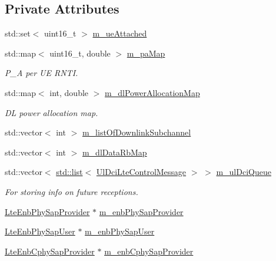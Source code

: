 \subsection*{Private Attributes}
\begin{DoxyCompactItemize}
\item 
std\+::set$<$ uint16\+\_\+t $>$ \hyperlink{classns3_1_1LteEnbPhy_a226e8d8e856ac3b90d45db11bbe23400}{m\+\_\+ue\+Attached}
\item 
std\+::map$<$ uint16\+\_\+t, double $>$ \hyperlink{classns3_1_1LteEnbPhy_a9fa0dd1722f59badf99d2aa32a417fff}{m\+\_\+pa\+Map}
\begin{DoxyCompactList}\small\item\em P\+\_\+A per UE R\+N\+TI. \end{DoxyCompactList}\item 
std\+::map$<$ int, double $>$ \hyperlink{classns3_1_1LteEnbPhy_a9296f50cf6ecc1ced51fb5172e49834f}{m\+\_\+dl\+Power\+Allocation\+Map}
\begin{DoxyCompactList}\small\item\em DL power allocation map. \end{DoxyCompactList}\item 
std\+::vector$<$ int $>$ \hyperlink{classns3_1_1LteEnbPhy_a9409ac53b340b281a15b614edd3ea5d1}{m\+\_\+list\+Of\+Downlink\+Subchannel}
\item 
std\+::vector$<$ int $>$ \hyperlink{classns3_1_1LteEnbPhy_a3fb8cd42886925222a259b135fa0c5e4}{m\+\_\+dl\+Data\+Rb\+Map}
\item 
std\+::vector$<$ \hyperlink{openflow-interface_8h_afd9bcfa176617760671b67580f536fa7}{std\+::list}$<$ \hyperlink{classns3_1_1UlDciLteControlMessage}{Ul\+Dci\+Lte\+Control\+Message} $>$ $>$ \hyperlink{classns3_1_1LteEnbPhy_a6c2e4f7f8dd477785e3f26244474f277}{m\+\_\+ul\+Dci\+Queue}
\begin{DoxyCompactList}\small\item\em For storing info on future receptions. \end{DoxyCompactList}\item 
\hyperlink{classns3_1_1LteEnbPhySapProvider}{Lte\+Enb\+Phy\+Sap\+Provider} $\ast$ \hyperlink{classns3_1_1LteEnbPhy_a8c195412adfe95d66ee4b7f1dbe4ab00}{m\+\_\+enb\+Phy\+Sap\+Provider}
\item 
\hyperlink{classns3_1_1LteEnbPhySapUser}{Lte\+Enb\+Phy\+Sap\+User} $\ast$ \hyperlink{classns3_1_1LteEnbPhy_a731048734464383920acca0e20a1f020}{m\+\_\+enb\+Phy\+Sap\+User}
\item 
\hyperlink{classns3_1_1LteEnbCphySapProvider}{Lte\+Enb\+Cphy\+Sap\+Provider} $\ast$ \hyperlink{classns3_1_1LteEnbPhy_ae8806a2346e70a3c93542fea54ebac52}{m\+\_\+enb\+Cphy\+Sap\+Provider}

\end{DoxyCompactItemize}
